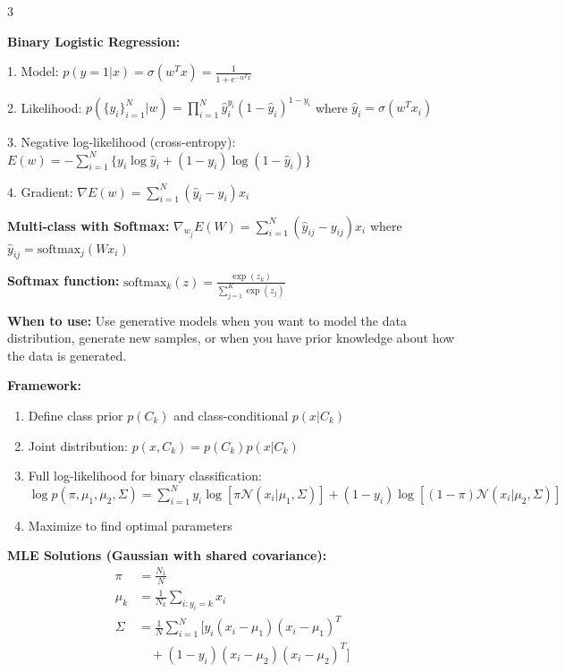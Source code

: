 \documentclass[10pt,landscape]{article}
\begin{document}
\begin{multicols}{3}
\begin{tcolorbox}[breakable, title=2.1 Logistic Regression Gradients, colback=classification]
\textbf{Binary Logistic Regression:}

1. Model: $p(y=1|x) = \sigma(w^Tx) = \frac{1}{1+e^{-w^Tx}}$

2. Likelihood: $p(\{y_i\}_{i=1}^{N}|w) = \prod_{i=1}^{N}\hat{y}_i^{y_i}(1-\hat{y}_i)^{1-y_i}$
where $\hat{y}_i = \sigma(w^Tx_i)$

3. Negative log-likelihood (cross-entropy):
$E(w) = -\sum_{i=1}^{N}\{y_i\log\hat{y}_i + (1-y_i)\log(1-\hat{y}_i)\}$

4. Gradient: $\nabla E(w) = \sum_{i=1}^{N}(\hat{y}_i - y_i)x_i$

\textbf{Multi-class with Softmax:}
$\nabla_{w_j}E(W) = \sum_{i=1}^{N}(\hat{y}_{ij} - y_{ij})x_i$
where $\hat{y}_{ij} = \text{softmax}_j(Wx_i)$

\textbf{Softmax function:} $\text{softmax}_k(z) = \frac{\exp(z_k)}{\sum_{j=1}^K\exp(z_j)}$
\end{tcolorbox}

\begin{tcolorbox}[breakable, title=2.2 Generative Models for Classification, colback=classification]
\textbf{When to use:} Use generative models when you want to model the data distribution, generate new samples, or when you have prior knowledge about how the data is generated.

\textbf{Framework:}
\begin{enumerate}[leftmargin=*,noitemsep,topsep=0pt]
    \item Define class prior $p(C_k)$ and class-conditional $p(x|C_k)$
    \item Joint distribution: $p(x, C_k) = p(C_k)p(x|C_k)$
    \item Full log-likelihood for binary classification:
    $\log p(\pi, \mu_1, \mu_2, \Sigma) = \sum_{i=1}^{N}y_i\log[\pi\mathcal{N}(x_i|\mu_1, \Sigma)] + (1-y_i)\log[(1-\pi)\mathcal{N}(x_i|\mu_2, \Sigma)]$
    \item Maximize to find optimal parameters
\end{enumerate}

\textbf{MLE Solutions (Gaussian with shared covariance):}
\begin{align}
\pi &= \frac{N_1}{N}\\
\mu_k &= \frac{1}{N_k}\sum_{i:y_i=k}x_i\\
\Sigma &= \frac{1}{N}\sum_{i=1}^{N}[y_i(x_i - \mu_1)(x_i - \mu_1)^T \\
&\quad + (1-y_i)(x_i - \mu_2)(x_i - \mu_2)^T]
\end{align}


\end{tcolorbox}
\end{multicols}
\end{document}
